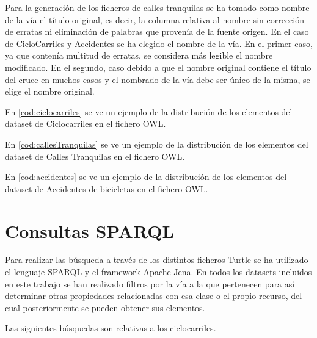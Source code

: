 Para la generación de los ficheros de calles tranquilas se ha tomado como nombre de la vía el título original, es decir, la columna relativa al nombre sin corrección de erratas ni eliminación de palabras que provenía de la fuente origen. En el caso de CicloCarriles y Accidentes se ha elegido el nombre de la vía. En el primer caso, ya que contenía multitud de erratas, se considera más legible el nombre modificado. En el segundo, caso debido a que el nombre original contiene el título del cruce en muchos casos y el nombrado de la vía debe ser único de la misma, se elige el nombre original.

En \ref{cod:ciclocarriles} se ve un ejemplo de la distribución de los elementos del dataset de Ciclocarriles en el fichero OWL.




En \ref{cod:callesTranquilas} se ve un ejemplo de la distribución de los elementos del dataset de Calles Tranquilas en el fichero OWL.




En \ref{cod:accidentes} se ve un ejemplo de la distribución de los elementos del dataset de Accidentes de bicicletas en el fichero OWL.









\clearpage
\section{Consultas SPARQL}

Para realizar las búsqueda a través de los distintos ficheros Turtle se ha utilizado el lenguaje SPARQL y el framework Apache Jena. En todos los datasets incluidos en este trabajo se han realizado filtros por la vía a la que pertenecen para así determinar otras propiedades relacionadas con esa clase o el propio recurso, del cual posteriormente se pueden obtener sus elementos.


Las siguientes búsquedas son relativas a los ciclocarriles.


